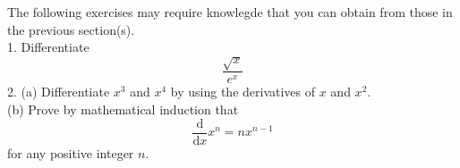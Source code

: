 The following exercises may require knowlegde that you can obtain from those in the previous section(s).\\
1. Differentiate
$$\frac{\sqrt x}{e^x}$$
2. (a) Differentiate $x^3$ and $x^4$ by using the derivatives of $x$ and $x^2$.\\
(b) Prove by mathematical induction that
$$\frac{\mathrm d}{\mathrm dx}x^n=nx^{n-1}$$
for any positive integer $n$.